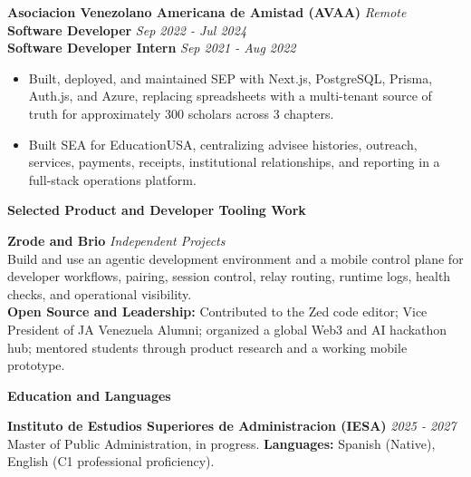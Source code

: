 \documentclass[10pt]{article}
\newcommand{\sectiontitle}[1]{%
    \vspace{4pt}
    \begin{center}
        \textbf{#1}
    \end{center}
    \vspace{-5pt}
}
\begin{document}
\vspace{2pt}
\textbf{Asociacion Venezolano Americana de Amistad (AVAA)} \hfill \textit{Remote} \\
\textbf{Software Developer} \hfill \textit{Sep 2022 - Jul 2024} \\
\textbf{Software Developer Intern} \hfill \textit{Sep 2021 - Aug 2022}
\begin{itemize}
    \item Built, deployed, and maintained SEP with Next.js, PostgreSQL, Prisma, Auth.js, and Azure, replacing spreadsheets with a multi-tenant source of truth for approximately 300 scholars across 3 chapters.
    \item Built SEA for EducationUSA, centralizing advisee histories, outreach, services, payments, receipts, institutional relationships, and reporting in a full-stack operations platform.
\end{itemize}

\sectiontitle{Selected Product and Developer Tooling Work}
\textbf{Zrode and Brio} \hfill \textit{Independent Projects} \\
Build and use an agentic development environment and a mobile control plane for developer workflows, pairing, session control, relay routing, runtime logs, health checks, and operational visibility. \\
\textbf{Open Source and Leadership:} Contributed to the Zed code editor; Vice President of JA Venezuela Alumni; organized a global Web3 and AI hackathon hub; mentored students through product research and a working mobile prototype.

\sectiontitle{Education and Languages}
\textbf{Instituto de Estudios Superiores de Administracion (IESA)} \hfill \textit{2025 - 2027} \\
Master of Public Administration, in progress. \textbf{Languages:} Spanish (Native), English (C1 professional proficiency).
\end{document}
